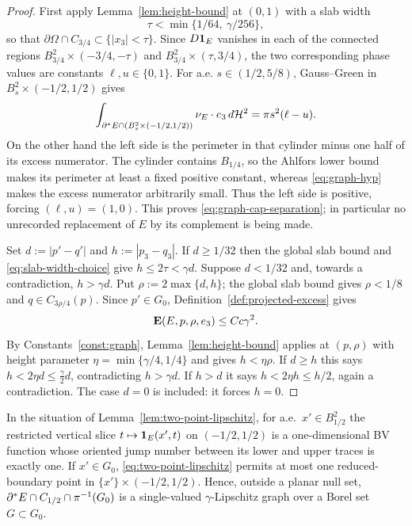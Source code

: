 \begin{proof}
First apply Lemma~\ref{lem:height-bound} at $(0,1)$ with a slab width
\begin{equation}\label{eq:slab-width-choice}
  \tau<\min\{1/64,\ \gamma/256\},
\end{equation}
so that $\partial\Omega\cap C_{3/4}\subset\{|x_3|<\tau\}$.  Since
$D\mathbf 1_{E}$ vanishes in each of the connected regions
$B_{3/4}^2\times(-3/4,-\tau)$ and
$B_{3/4}^2\times(\tau,3/4)$, the two corresponding phase values are constants
$\ell,u\in\{0,1\}$.  For a.e. $s\in(1/2,5/8)$, Gauss--Green in
$B_s^2\times(-1/2,1/2)$ gives
\[
 \int_{\partial^* E\cap(B_s^2\times(-1/2,1/2))}\nu_E\cdot e_3\,d\mathcal H^2
 =\pi s^2(\ell-u).
\]
On the other hand the left side is the perimeter in that cylinder minus one
half of its excess numerator.  The cylinder contains $B_{1/4}$, so the
Ahlfors lower bound makes its perimeter at least a fixed positive constant,
whereas \eqref{eq:graph-hyp} makes the excess numerator arbitrarily small.
Thus the left side is positive, forcing $(\ell,u)=(1,0)$.  This proves
\eqref{eq:graph-cap-separation}; in particular no unrecorded replacement of
$E$ by its complement is being made.

Set $d:=|p'-q'|$ and $h:=|p_3-q_3|$.  If $d\ge1/32$ then the global slab
bound and \eqref{eq:slab-width-choice} give $h\le2\tau<\gamma d$.  Suppose
$d<1/32$ and, towards a contradiction, $h>\gamma d$.  Put
$\rho:=2\max\{d,h\}$; the global slab bound gives $\rho<1/8$ and
$q\in C_{3\rho/4}(p)$.  Since $p'\in G_0$,
Definition~\ref{def:projected-excess} gives
\begin{equation}\label{eq:excess-at-p}
  \operatorname{\mathbf E}(E,p,\rho,e_3)\le Cc\gamma^2 .
\end{equation}
By Constants~\ref{const:graph}, Lemma~\ref{lem:height-bound} applies at
$(p,\rho)$ with height parameter $\eta=\min\{\gamma/4,1/4\}$ and gives
$h<\eta\rho$.  If $d\ge h$ this says $h<2\eta d\le\tfrac\gamma2d$,
contradicting $h>\gamma d$.  If $h>d$ it says $h<2\eta h\le h/2$, again a
contradiction.  The case $d=0$ is included: it forces $h=0$.
\end{proof}

\begin{lemma}\label{lem:single-valued}
In the situation of Lemma~\ref{lem:two-point-lipschitz}, for a.e.\
$x'\in B^2_{1/2}$ the restricted vertical slice
$t\mapsto\mathbf 1_{E}(x',t)$ on $(-1/2,1/2)$ is a one-dimensional BV function
whose oriented jump number between its lower and upper traces is exactly one.
If $x'\in G_0$, \eqref{eq:two-point-lipschitz} permits at most one
reduced-boundary point in $\{x'\}\times(-1/2,1/2)$.  Hence, outside a planar
null set, $\partial^* E\cap C_{1/2}\cap\pi^{-1}(G_0)$ is a single-valued
$\gamma$-Lipschitz graph over a Borel set $G\subset G_0$.
\end{lemma}

